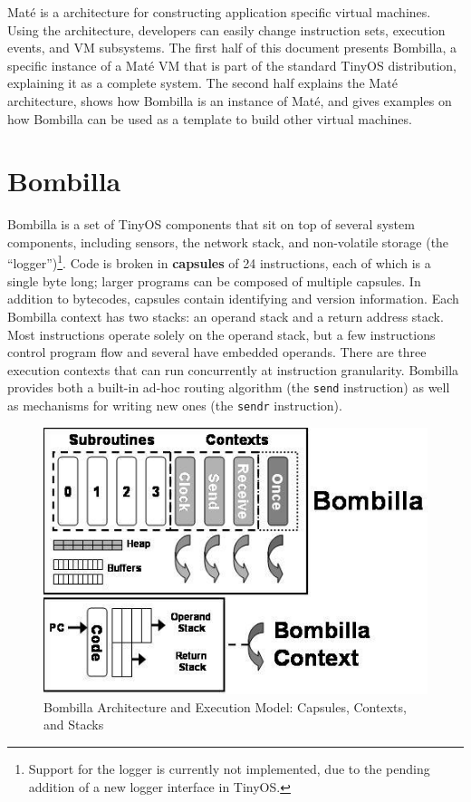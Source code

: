 \documentclass[10pt]{article}
\newcommand{\mate}{Mat\'{e}\xspace}
\newcommand{\bomb}{Bombilla\xspace}
\begin{document}
\mate is a architecture for constructing application specific virtual
machines. Using the architecture, developers can easily change
instruction sets, execution events, and VM subsystems. The first half
of this document presents \bomb, a specific instance of a \mate VM
that is part of the standard TinyOS distribution, explaining it as a
complete system. The second half explains the \mate architecture,
shows how \bomb is an instance of \mate, and gives examples on how
\bomb can be used as a template to build other virtual machines.


\section{\bomb}

\bomb is a set of TinyOS components that sit on top of several
system components, including sensors, the network stack, and
non-volatile storage (the ``logger'')\footnote{Support for the logger
is currently not implemented, due to the pending addition of a new
logger interface in TinyOS.}. Code is broken in {\bf capsules} of 24
instructions, each of which is a single byte long; larger programs can
be composed of multiple capsules. In addition to bytecodes, capsules
contain identifying and version information. Each \bomb context has
two stacks: an operand stack and a return address stack. Most
instructions operate solely on the operand stack, but a few
instructions control program flow and several have embedded
operands. There are three execution contexts that can run concurrently
at instruction granularity. \bomb provides both a built-in ad-hoc
routing algorithm (the {\tt send} instruction) as well as mechanisms
for writing new ones (the {\tt sendr} instruction).


\begin{figure}
\centering
\includegraphics[scale=0.4]{fig/bombillamodel.jpg}

\caption{\bomb Architecture and Execution Model: Capsules, Contexts, and Stacks}

\label{fig:exec}
\end{figure}
\end{document}
